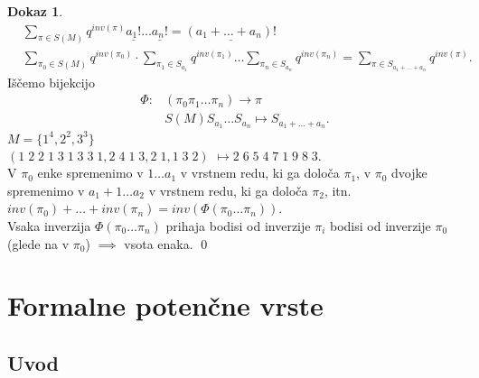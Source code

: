 \documentclass[a4paper, 12pt]{book}
\theoremstyle{definition}
\newtheorem{pro}[counter]{Dokaz}
\theoremstyle{remark}
\begin{document}
\begin{pro}
  \begin{align*}
    &\sum_{\pi \in S(M)} q^{inv(\pi)} \underline{a_1!} \dots \underline{a_n!} = \underline{(a_1 + \dots + a_n)!} \\
    &\sum_{\pi_0 \in S(M)} q^{inv(\pi_0)} \cdot \sum_{\pi_1 \in S_{a_1}} q^{inv(\pi_1)} \dots
      \sum_{\pi_n \in S_{a_n}} q^{inv(\pi_n)} = \sum_{\pi \in S_{a_1 + \dots + a_n}} q^{inv(\pi)}.
  \end{align*}
  Iščemo bijekcijo
  \begin{align*}
    \Phi: &(\pi_0 \pi_1 \dots \pi_n) \to \pi \\
    &S(M) S_{a_1} \dots S_{a_n} \mapsto S_{a_1 + \dots + a_n}.
  \end{align*}
  $M = \{1^4, 2^2, 3^3\}$ \\
  $(1 \; 2 \; 2 \; 1 \; 3 \; 1 \; 3 \; 3 \; 1, 2 \; 4 \; 1 \; 3, 2 \; 1, 1 \; 3 \; 2)$
  $\mapsto 2 \; 6 \; 5 \; 4 \; 7 \; 1 \; 9 \; 8 \; 3$. \\
  V $\pi_0$ enke spremenimo v $1 \dots a_1$ v vrstnem redu, ki ga določa $\pi_1$,
  v $\pi_0$ dvojke spremenimo v $a_1+1 \dots a_2$ v vrstnem redu, ki ga določa $\pi_2$, itn. \\
  $inv(\pi_0) + \dots + inv(\pi_n) = inv\left(\Phi(\pi_0 \dots \pi_n)\right)$. \\
  Vsaka inverzija $\Phi(\pi_0 \dots \pi_n)$ prihaja bodisi od inverzije $\pi_i$ bodisi od inverzije $\pi_0$
  (glede na  v $\pi_0$) $\implies$ vsota enaka.
  \qed
\end{pro}



\chapter{Formalne potenčne vrste}


\section{Uvod}
\end{document}
